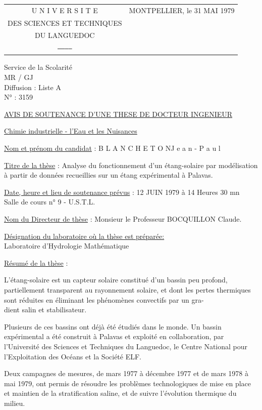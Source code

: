 \begin{tabular}{c@{\qquad}l}
U N I V E R S I T E & MONTPELLIER, le 31 MAI 1979\\
DES SCIENCES ET TECHNIQUES &\\
DU LANGUEDOC &\\
\texttt{------------} &
\end{tabular}

Service de la Scolarité\\
MR / GJ\\
Diffusion : Liste A\\
N° : 3159

\uline{AVIS DE SOUTENANCE D'UNE THESE DE DOCTEUR INGENIEUR}

\uline{Chimie industrielle - l'Eau et les Nuisances}

\uline{Nom et prénom du candidat} : B L A N C H E T O N\quad J e a n - P a u l

\uline{Titre de la thèse} : Analyse du fonctionnement d'un étang-solaire par modélisation à partir de données recueillies sur un étang expérimental à Palavas.

\uline{Date, heure et lieu de soutenance prévus} : 12 JUIN 1979 à 14 Heures 30 mn\\
Salle de cours n° 9 - U.S.T.L.

\uline{Nom du Directeur de thèse} : Monsieur le Professeur BOCQUILLON Claude.

\uline{Désignation du laboratoire où la thèse est préparée:}\\
Laboratoire d'Hydrologie Mathématique

\uline{Résumé de la thèse} :

L'étang-solaire est un capteur solaire constitué d'un bassin peu profond, partiellement transparent au rayonnement solaire, et dont les pertes thermiques sont réduites en éliminant les phénomènes convectifs par un gra-\\
dient salin et stabilisateur.

Plusieurs de ces bassins ont déjà été étudiés dans le monde. Un bassin expérimental a été construit à Palavas et exploité en collaboration, par l'Université des Sciences et Techniques du Languedoc, le Centre National pour l'Exploitation des Océans et la Société ELF.

Deux campagnes de mesures, de mars 1977 à décembre 1977 et de mars 1978 à mai 1979, ont permis de résoudre les problèmes technologiques de mise en place et maintien de la stratification saline, et de suivre l'évolution thermique du milieu.

